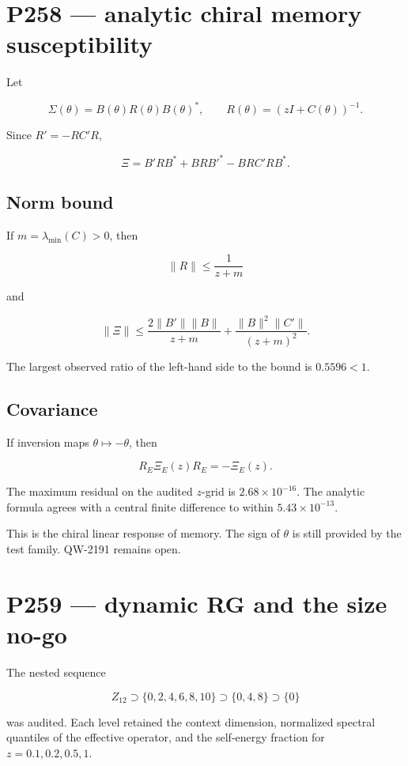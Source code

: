 \documentclass[11pt,a4paper,openany]{report}
\begin{document}
\chapter{P258 --- analytic chiral memory susceptibility}

Let

\[
\Sigma(\theta)=B(\theta)R(\theta)B(\theta)^\ast,
\qquad
R(\theta)=(zI+C(\theta))^{-1}.
\]

Since \(R'=-RC'R\),

\[
\boxed{
\Xi
=
B'RB^\ast+BRB'^\ast-BRC'RB^\ast
}.
\]

\section{Norm bound}

If \(m=\lambda_{\min}(C)>0\), then

\[
\|R\|\leq\frac1{z+m}
\]

and

\[
\|\Xi\|
\leq
\frac{2\|B'\|\|B\|}{z+m}
+
\frac{\|B\|^2\|C'\|}{(z+m)^2}.
\]

The largest observed ratio of the left-hand side to the bound is \(0.5596<1\).

\section{Covariance}

If inversion maps \(\theta\mapsto-\theta\), then

\[
R_E\Xi_E(z)R_E=-\Xi_E(z).
\]

The maximum residual on the audited \(z\)-grid is \(2.68\times10^{-16}\). The analytic formula agrees with a central finite difference to within \(5.43\times10^{-13}\).

This is the chiral linear response of memory. The sign of \(\theta\) is still provided by the test family. QW-2191 remains open.

\chapter{P259 --- dynamic RG and the size no-go}

The nested sequence

\[
Z_{12}
\supset
\{0,2,4,6,8,10\}
\supset
\{0,4,8\}
\supset
\{0\}
\]

was audited. Each level retained the context dimension, normalized spectral quantiles of the effective operator, and the self-energy fraction for \(z=0.1,0.2,0.5,1\).
\end{document}
